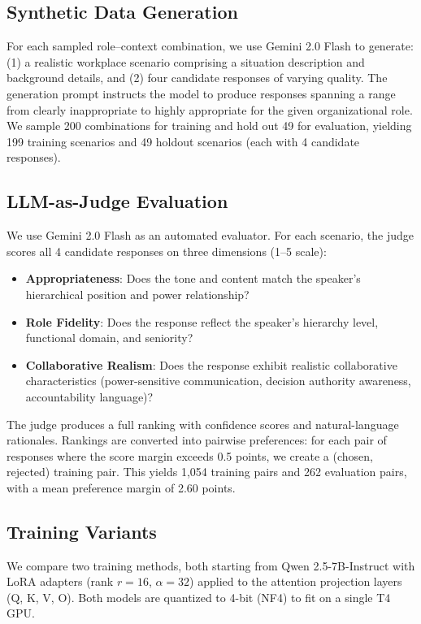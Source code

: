 \documentclass{article}
\begin{document}
\subsection{Synthetic Data Generation}

For each sampled role--context combination, we use Gemini 2.0 Flash to generate: (1) a realistic workplace scenario comprising a situation description and background details, and (2) four candidate responses of varying quality. The generation prompt instructs the model to produce responses spanning a range from clearly inappropriate to highly appropriate for the given organizational role. We sample 200 combinations for training and hold out 49 for evaluation, yielding 199 training scenarios and 49 holdout scenarios (each with 4 candidate responses).

\subsection{LLM-as-Judge Evaluation}

We use Gemini 2.0 Flash as an automated evaluator. For each scenario, the judge scores all 4 candidate responses on three dimensions (1--5 scale):
\begin{itemize}
    \item \textbf{Appropriateness}: Does the tone and content match the speaker's hierarchical position and power relationship?
    \item \textbf{Role Fidelity}: Does the response reflect the speaker's hierarchy level, functional domain, and seniority?
    \item \textbf{Collaborative Realism}: Does the response exhibit realistic collaborative characteristics (power-sensitive communication, decision authority awareness, accountability language)?
\end{itemize}
The judge produces a full ranking with confidence scores and natural-language rationales. Rankings are converted into pairwise preferences: for each pair of responses where the score margin exceeds 0.5 points, we create a (chosen, rejected) training pair. This yields 1,054 training pairs and 262 evaluation pairs, with a mean preference margin of 2.60 points.

\subsection{Training Variants}

We compare two training methods, both starting from Qwen 2.5-7B-Instruct with LoRA adapters \citep{hu2022lora} (rank $r=16$, $\alpha=32$) applied to the attention projection layers (Q, K, V, O). Both models are quantized to 4-bit (NF4) to fit on a single T4 GPU.
\end{document}
